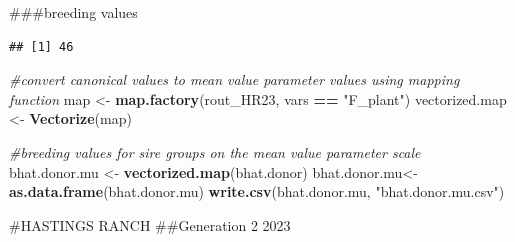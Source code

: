 \documentclass[
]{article}
\newenvironment{Shaded}{\begin{snugshade}}{\end{snugshade}}
\newcommand{\CommentTok}[1]{\textcolor[rgb]{0.56,0.35,0.01}{\textit{#1}}}
\newcommand{\FunctionTok}[1]{\textcolor[rgb]{0.13,0.29,0.53}{\textbf{#1}}}
\newcommand{\NormalTok}[1]{#1}
\newcommand{\OtherTok}[1]{\textcolor[rgb]{0.56,0.35,0.01}{#1}}
\newcommand{\SpecialCharTok}[1]{\textcolor[rgb]{0.81,0.36,0.00}{\textbf{#1}}}
\newcommand{\StringTok}[1]{\textcolor[rgb]{0.31,0.60,0.02}{#1}}
\begin{document}
\#\#\#breeding values

\begin{Shaded}
\end{Shaded}

\begin{verbatim}
## [1] 46
\end{verbatim}

\begin{Shaded}
\begin{Highlighting}[]
\CommentTok{\#convert canonical values to mean value parameter values using mapping function}
\NormalTok{map }\OtherTok{\textless{}{-}} \FunctionTok{map.factory}\NormalTok{(rout\_HR23, vars }\SpecialCharTok{==} \StringTok{"F\_plant"}\NormalTok{)}
\NormalTok{vectorized.map }\OtherTok{\textless{}{-}} \FunctionTok{Vectorize}\NormalTok{(map)}

\CommentTok{\#breeding values for sire groups on the mean value parameter scale }
\NormalTok{bhat.donor.mu }\OtherTok{\textless{}{-}} \FunctionTok{vectorized.map}\NormalTok{(bhat.donor)}
\NormalTok{bhat.donor.mu}\OtherTok{\textless{}{-}}\FunctionTok{as.data.frame}\NormalTok{(bhat.donor.mu)}
\FunctionTok{write.csv}\NormalTok{(bhat.donor.mu, }\StringTok{"bhat.donor.mu.csv"}\NormalTok{)}
\end{Highlighting}
\end{Shaded}

\#HASTINGS RANCH \#\#Generation 2 2023

\begin{Shaded}
\end{Shaded}
\end{document}
